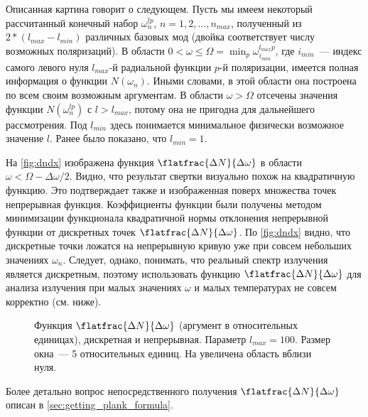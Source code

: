     Описанная картина говорит о следующем. Пусть мы имеем некоторый рассчитанный конечный набор $\omega^{lp}_n$, $n = 1, 2, \dots, n_{max}$, полученный из $2 * (l_{max} - l_{min})$ различных базовых мод (двойка соответствует числу возможных поляризаций). В области $0 < \omega \le \Omega = \min_p{\omega^{l_{max}p}_{i_{min}}}$, где $i_{min}$~--- индекс самого левого нуля $l_{max}$-й радиальной функции $p$-й поляризации, имеется полная информация о функции $N(\omega_n)$. Иными словами, в этой области она построена по всем своим возможным аргументам. В области $\omega > \Omega$ отсечены значения функции $N(\omega^{lp}_n)$ с $l > l_{max}$, потому она не пригодна для дальнейшего рассмотрения. Под $l_{min}$ здесь понимается минимальное физически возможное значение $l$. Ранее было показано, что $l_{min} = 1$.

    На \autoref{fig:dndx} изображена функция $\flatfrac{\Delta N}{\Delta \omega}$ в области $\omega < \Omega - \Delta\omega / 2$. Видно, что результат свертки визуально похож на квадратичную функцию. Это подтверждает также и изображенная поверх множества точек непрерывная функция. Коэффициенты функции были получены методом минимизации функционала квадратичной нормы отклонения непрерывной функции от дискретных точек $\flatfrac{\Delta N}{\Delta \omega}$. По \autoref{fig:dndx} видно, что дискретные точки ложатся на непрерывную кривую уже при совсем небольших значениях $\omega_n$. Следует, однако, понимать, что реальный спектр излучения является дискретным, поэтому использовать функцию $\flatfrac{\Delta N}{\Delta \omega}$ для анализа излучения при малых значениях $\omega$ и малых температурах не совсем корректно (см. ниже).
    \begin{figure}[h]
        \centering
        \hspace{8pt}%
        \hspace{8pt}%
        \caption[]{Функция $\flatfrac{\Delta N}{\Delta \omega}$ (аргумент в относительных единицах), дискретная и непрерывная. Параметр $l_{max} = 100$. Размер окна~--- 5 относительных единиц. На  увеличена область вблизи нуля. %
        } %
        \label{fig:dndx}%
    \end{figure}

    Более детально вопрос непосредственного получения $\flatfrac{\Delta N}{\Delta \omega}$ описан в \autoref{sec:getting_plank_formula}.

